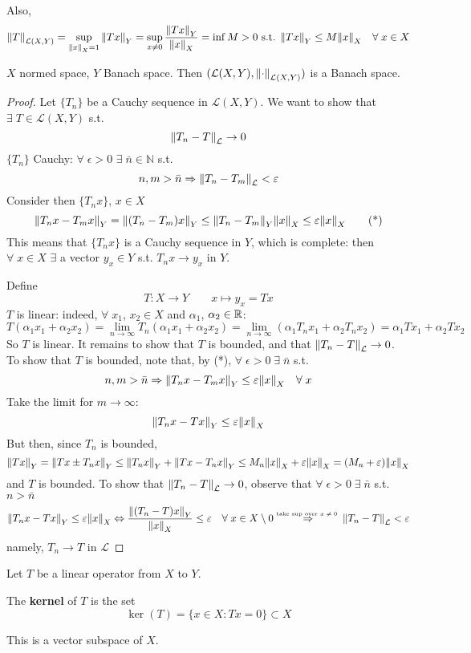 Also, 
\[
    \norm{T}_{\mathcal{L}(X, Y)} = \sup_{\norm{x}_X = 1} \norm{Tx}_Y = \sup_{x \neq 0} \frac{\norm{Tx}_Y}{\norm{x}_X} = \inf{M >0 \text{ s.t. } \norm{Tx}_Y \leq M \norm{x}_X \quad \forall \; x \in X}
\]

\begin{theorem}
    \(X\) normed space, \(Y\) Banach space. Then \((\mathcal{L}(X, Y), \norm{\cdot}_{\mathcal{L}(X, Y)})\) is a Banach space.
\end{theorem}
\begin{proof}
    Let \(\{T_n\}\) be a Cauchy sequence in \(\mathcal{L}(X, Y)\). We want to show that \(\exists \; T \in \mathcal{L}(X, Y) \) s.t.
    \[
        \norm{T_n - T}_\mathcal{L} \to 0
    \]
    \(\{T_n\}\) Cauchy: \(\forall \; \epsilon >0 \) \(\exists \; \bar{n} \in \mathbb{N}\) s.t. 
    \[
        n, m > \bar{n} \Rightarrow \norm{T_n - T_m }_\mathcal{L} < \varepsilon
    \]
    Consider then \(\{ T_n x \}\), \(x \in X\)
    \[
        \norm{T_n x - T_m x }_Y = \norm{(T_n - T_m)x}_Y \leq \norm{T_n - T_m}_Y \norm{x}_X \leq \varepsilon \norm{x}_X \tag{*}
    \]
    This means that \(\{ T_n x \}\) is a Cauchy sequence in \(Y\), which is complete: then \(\forall \; x \in X\) \(\exists \) a vector \(y_x \in Y\) s.t. \(T_n x \to y_x\) in \(Y\).

    Define 
    \[
        T: X \to Y \qquad x \mapsto y_x = Tx
    \]
    \(T\) is linear: indeed, \(\forall \; x_1\), \(x_2 \in X\) and \(\alpha_1\), \(\alpha_2 \in \mathbb{R}\):
    \[
        T(\alpha_1 x_1 + \alpha_2 x_2) = \lim_{n \to \infty} T_n (\alpha_1 x_1 + \alpha_2 x_2) = \lim_{n \to \infty} (\alpha_1 T_n x_1 + \alpha_2 T_n x_2) = \alpha_1 Tx_1 + \alpha_2 Tx_2
    \]
    So \(T \) is linear. It remains to show that \(T\) is bounded, and that \(\norm{T_n - T}_{\mathcal{L}} \to 0\).
    To show that \(T\) is bounded, note that, by (*), \(\forall \; \epsilon >0 \; \exists \; \bar{n}\) s.t.
    \[
        n, m > \bar{n} \Rightarrow \norm{T_n x - T_m x}_Y \leq \varepsilon \norm{x}_X \quad \forall \; x 
    \]
    Take the limit for \(m \to \infty\): 
    \[
        \norm{T_n x - Tx}_Y \leq \varepsilon \norm{x}_X
    \]
    But then, since \(T_n\) is bounded, 
    \[
        \norm{Tx}_Y = \norm{Tx \pm T_n x}_Y \leq \norm{T_n x}_Y + \norm{Tx - T_n x}_Y \leq M_n \norm{x}_X + \varepsilon \norm{x}_X = (M_n + \varepsilon) \norm{x}_X
    \]
    and \(T\) is bounded. To show that \(\norm{T_n - T}_\mathcal{L} \to 0\), observe that \(\forall \; \epsilon >0 \; \exists \; \bar{n} \) s.t. \(n > \bar{n}\)
    \[
        \norm{T_n x - Tx}_Y \leq \varepsilon \norm{x}_X 
        \Leftrightarrow \frac{\norm{(T_n - T)x}_Y}{\norm{x}_X} \leq \varepsilon \quad \forall \; x \in X \setminus {0}
        \overset{\text{\tiny{take sup over \(x \neq 0\)} }}{\Rightarrow} \norm{T_n - T}_\mathcal{L} < \varepsilon
    \]
    namely, \(T_n \to T\) in \(\mathcal{L}\)
\end{proof}
Let \(T\) be a linear operator from \(X\) to \(Y\).
\begin{definition}
    The \textbf{kernel} of \(T\) is the set 
    \[
        \ker(T) = \{ x \in X: Tx =0\} \subset X
    \]

\end{definition}
This is a vector subspace of \(X\). 

